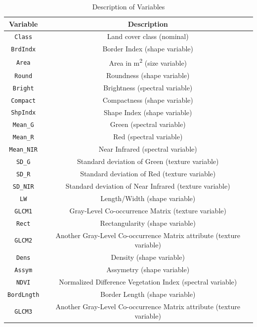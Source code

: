 \documentclass[11pt]{article}
\begin{document}
\begin{table}[h]
\centering
\begin{tabular}{|c|c|}
\hline
\textbf{Variable} & \textbf{Description} \\
\hline
\texttt{Class} & Land cover class (nominal) \\
\texttt{BrdIndx} & Border Index (shape variable) \\
\texttt{Area} & Area in m\textsuperscript{2} (size variable) \\
\texttt{Round} & Roundness (shape variable) \\
\texttt{Bright} & Brightness (spectral variable) \\
\texttt{Compact} & Compactness (shape variable) \\
\texttt{ShpIndx} & Shape Index (shape variable) \\
\texttt{Mean\_G} & Green (spectral variable) \\
\texttt{Mean\_R} & Red (spectral variable) \\
\texttt{Mean\_NIR} & Near Infrared (spectral variable) \\
\texttt{SD\_G} & Standard deviation of Green (texture variable) \\
\texttt{SD\_R} & Standard deviation of Red (texture variable) \\
\texttt{SD\_NIR} & Standard deviation of Near Infrared (texture variable) \\
\texttt{LW} & Length/Width (shape variable) \\
\texttt{GLCM1} & Gray-Level Co-occurrence Matrix (texture variable) \\
\texttt{Rect} & Rectangularity (shape variable) \\
\texttt{GLCM2} & Another Gray-Level Co-occurrence Matrix attribute (texture variable) \\
\texttt{Dens} & Density (shape variable) \\
\texttt{Assym} & Assymetry (shape variable) \\
\texttt{NDVI} & Normalized Difference Vegetation Index (spectral variable) \\
\texttt{BordLngth} & Border Length (shape variable) \\
\texttt{GLCM3} & Another Gray-Level Co-occurrence Matrix attribute (texture variable) \\
\hline
\end{tabular}
\caption{Description of Variables}
\label{tab:variables}
\end{table}
\end{document}
